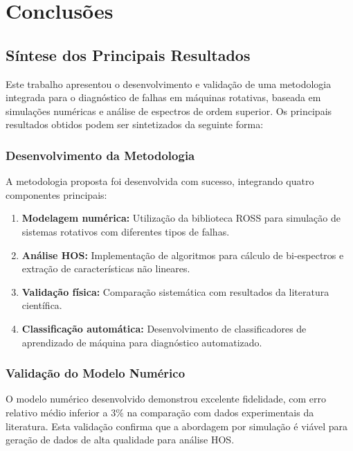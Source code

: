 
\chapter{Conclusões}

\section{Síntese dos Principais Resultados}

Este trabalho apresentou o desenvolvimento e validação de uma metodologia integrada para o diagnóstico de falhas em máquinas rotativas, baseada em simulações numéricas e análise de espectros de ordem superior. Os principais resultados obtidos podem ser sintetizados da seguinte forma:

\subsection{Desenvolvimento da Metodologia}

A metodologia proposta foi desenvolvida com sucesso, integrando quatro componentes principais:

\begin{enumerate}
    \item \textbf{Modelagem numérica:} Utilização da biblioteca ROSS para simulação de sistemas rotativos com diferentes tipos de falhas.
    \item \textbf{Análise HOS:} Implementação de algoritmos para cálculo de bi-espectros e extração de características não lineares.
    \item \textbf{Validação física:} Comparação sistemática com resultados da literatura científica.
    \item \textbf{Classificação automática:} Desenvolvimento de classificadores de aprendizado de máquina para diagnóstico automatizado.
\end{enumerate}

\subsection{Validação do Modelo Numérico}

O modelo numérico desenvolvido demonstrou excelente fidelidade, com erro relativo médio inferior a 3\% na comparação com dados experimentais da literatura. Esta validação confirma que a abordagem por simulação é viável para geração de dados de alta qualidade para análise HOS.

